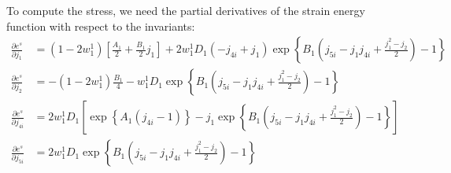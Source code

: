\documentclass{article}
\begin{document}
To compute the stress, we need the partial derivatives of the strain energy function with respect to the invariants:
\small
\begin{subequations}
\begin{align}
   \frac{\partial e^s}{\partial j_1} &= \left(1-2w_1^1\right)\left[\frac{A_1}{2} + \frac{B_1}{2}j_1\right] + 2w_1^1D_1\left(-j_{4i} + j_1\right)\exp\left\{B_1\left(j_{5i}-j_1j_{4i}+\frac{j_1^2-j_2}{2}\right)-1\right\} \\
   \frac{\partial e^s}{\partial j_2} &= -\left(1-2w_1^1\right)\frac{B_1}{4} - w_1^1D_1\exp\left\{B_1\left(j_{5i}-j_1j_{4i}+\frac{j_1^2-j_2}{2}\right)-1\right\} \\
   \frac{\partial e^s}{\partial j_{4i}} &= 2w_1^1D_1\left[\exp\left\{A_1\left(j_{4i}-1\right)\right\} - j_1 \exp\left\{B_1\left(j_{5i}-j_1j_{4i}+\frac{j_1^2-j_2}{2}\right)-1\right\} \right]\\
   \frac{\partial e^s}{\partial j_{5i}} &= 2w_1^1D_1\exp\left\{B_1\left(j_{5i}-j_1j_{4i}+\frac{j_1^2-j_2}{2}\right)-1\right\}
\end{align}
\end{subequations}
\end{document}
